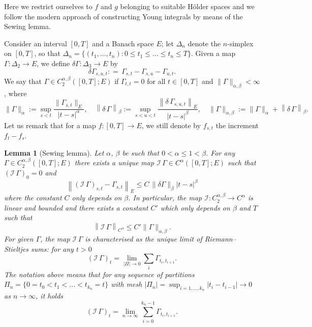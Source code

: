 \documentclass[10pt]{article}
\newcommand{\assign}{:=}
\newtheorem{lemma}[theorem]{Lemma}
\begin{document}
Here we restrict ourselves to $f$ and $g$ belonging to suitable H\"{o}lder
spaces and we follow the modern approach of constructing Young integrals by
means of the Sewing lemma.

Consider an interval $[0, T]$ and a Banach space $E$; let $\Delta_n$ denote
the $n$\mbox{-}simplex on $[0, T]$, so that $\Delta_n = \{ (t_1, \ldots, t_n)
: 0 \leqslant t_1 \leqslant \ldots \leqslant t_n \leqslant T \}$. Given a map
$\Gamma : \Delta_2 \rightarrow E$, we define $\delta \Gamma : \Delta_3
\rightarrow E$ by
\[ \delta \Gamma_{s, u, t} : = \, \Gamma_{s, t} - \Gamma_{s, u} - \Gamma_{u,
   t} . \]
We say that $\Gamma \in C^{\alpha, \beta}_2 ([0, T] ; E)$ if $\Gamma_{t, t} =
0$ for all $t \in [0, T]$ and $\| \Gamma \|_{\alpha, \beta} < \infty$, where
\[ \| \Gamma \|_{\alpha} \assign \sup_{s < t} \frac{\| \Gamma_{s, t} \|_E}{| t
   - s |^{\alpha}}, \quad \left\| \delta \, \Gamma \right\|_{\beta} \assign
   \sup_{s < u < t} \frac{\left\| \delta \, \Gamma_{s, u, t} \right\|_E}{| t -
   s |^{\beta}}, \quad \| \Gamma \|_{\alpha, \beta} \assign \| \Gamma
   \|_{\alpha} + \left\| \delta \, \Gamma \right\|_{\beta} . \]
Let us remark that for a map $f : [0, T] \rightarrow E$, we still denote by
$f_{s, t}$ the increment $f_t - f_s$.

\begin{lemma}[Sewing lemma]
  \label{appendixA1 sewing lemma}Let $\alpha$, $\beta$ be such that $0 <
  \alpha \leqslant 1 < \beta$. For any $\Gamma \in C^{\alpha, \beta}_2 ([0, T]
  ; E)$ there exists a unique map $\mathcal{I} \, \Gamma \in C^{\alpha} ([0,
  T] ; E)$ such that $\left( \mathcal{I} \, \Gamma \right)_0 = 0$ and
  \begin{equation}
    \left\| \left( \mathcal{I} \, \Gamma \right)_{s, t} - \Gamma_{s, t}
    \right\|_E \leqslant C \, \| \delta \Gamma \|_{\beta}  | t - s |^{\beta}
    \label{appendixA1 sewing property 1}
  \end{equation}
  where the constant $C$ only depends on $\beta$. In particular, the map
  $\mathcal{I} : C^{\alpha, \beta}_2 \rightarrow C^{\alpha}$ is linear and
  bounded and there exists a constant $C'$ which only depends on $\beta$ and
  $T$ such that
  \begin{equation}
    \left\| \mathcal{I} \, \Gamma \right\|_{C^{\alpha}} \leqslant C'  \|
    \Gamma \|_{\alpha, \beta} . \label{appendixA1 sewing property 2}
  \end{equation}
  For given $\Gamma$, the map $\mathcal{I} \, \Gamma$ is characterised as the
  unique limit of Riemann--Stieltjes sums: for any $t > 0$
  \[ \left( \mathcal{I} \, \Gamma \right)_t = \lim_{| \Pi | \rightarrow 0}
     \sum_i \Gamma_{t_i, t_{i + 1}} . \]
  The notation above means that for any sequence of partitions $\Pi_n = \{ 0 =
  t_0 < t_1 < \ldots < t_{k_n} = t \}$ with mesh $| \Pi_n | = \sup_{i = 1,
  \ldots, k_n} | t_i - t_{i - 1} | \rightarrow 0$ as $n \rightarrow \infty$,
  it holds
  \[ \left( \mathcal{I} \, \Gamma \right)_t = \lim_{n \rightarrow \infty}
     \sum_{i = 0}^{k_n - 1} \Gamma_{t_i, t_{i + 1}} . \]
\end{lemma}
\end{document}
